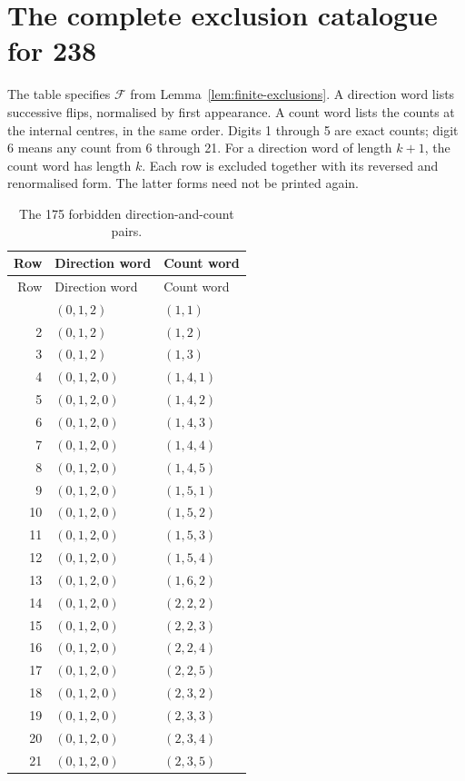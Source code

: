 \documentclass[11pt,a4paper]{article}
\theoremstyle{definition}
\theoremstyle{remark}
\begin{document}
\section{The complete exclusion catalogue for 238}\label{app:exclusion-catalogue}
The table specifies $\mathcal F$ from Lemma~\ref{lem:finite-exclusions}. A direction word lists successive flips, normalised by first appearance. A count word lists the counts at the internal centres, in the same order. Digits 1 through 5 are exact counts; digit 6 means any count from 6 through 21. For a direction word of length $k+1$, the count word has length $k$. Each row is excluded together with its reversed and renormalised form. The latter forms need not be printed again.

\begin{longtable}{rll}
\caption{The 175 forbidden direction-and-count pairs.}\label{tab:exclusion-catalogue}\\
\toprule
Row & Direction word & Count word\\
\midrule
\endfirsthead
\toprule
Row & Direction word & Count word\\
\midrule
\endhead
\bottomrule
\endfoot
1 & $(0,1,2)$ & $(1,1)$\\
2 & $(0,1,2)$ & $(1,2)$\\
3 & $(0,1,2)$ & $(1,3)$\\
4 & $(0,1,2,0)$ & $(1,4,1)$\\
5 & $(0,1,2,0)$ & $(1,4,2)$\\
6 & $(0,1,2,0)$ & $(1,4,3)$\\
7 & $(0,1,2,0)$ & $(1,4,4)$\\
8 & $(0,1,2,0)$ & $(1,4,5)$\\
9 & $(0,1,2,0)$ & $(1,5,1)$\\
10 & $(0,1,2,0)$ & $(1,5,2)$\\
11 & $(0,1,2,0)$ & $(1,5,3)$\\
12 & $(0,1,2,0)$ & $(1,5,4)$\\
13 & $(0,1,2,0)$ & $(1,6,2)$\\
14 & $(0,1,2,0)$ & $(2,2,2)$\\
15 & $(0,1,2,0)$ & $(2,2,3)$\\
16 & $(0,1,2,0)$ & $(2,2,4)$\\
17 & $(0,1,2,0)$ & $(2,2,5)$\\
18 & $(0,1,2,0)$ & $(2,3,2)$\\
19 & $(0,1,2,0)$ & $(2,3,3)$\\
20 & $(0,1,2,0)$ & $(2,3,4)$\\
21 & $(0,1,2,0)$ & $(2,3,5)$\\

\end{longtable}
\end{document}
